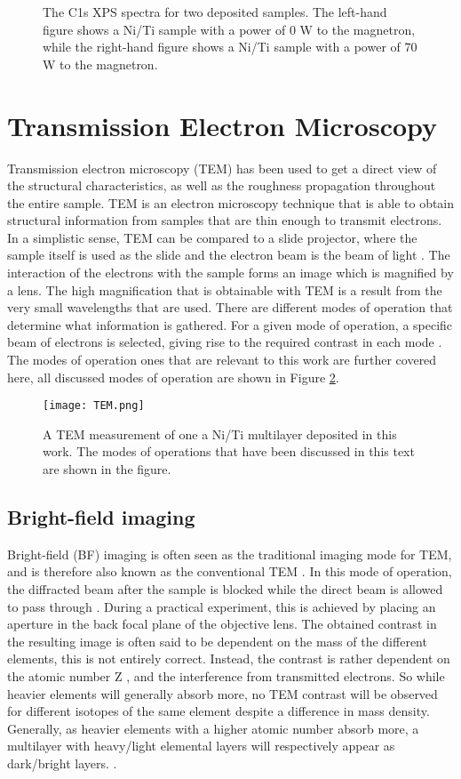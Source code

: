 \begin{figure}
	\centering
	\def\svgwidth{\textwidth}
	
	\caption{The C1s XPS spectra for two deposited samples. The left-hand figure shows a Ni/Ti sample with a power of 0 W to the  \natBC  magnetron, while the right-hand figure shows a Ni/Ti sample with a power of 70 W to the \natBC magnetron.}
	\label{XPS}
\end{figure}
\section{Transmission Electron Microscopy}\label{TEM}
Transmission electron microscopy (TEM) has been used to get a direct view of the structural characteristics, as well as the roughness propagation throughout the entire sample. TEM is an electron microscopy technique that is able to obtain structural information from samples that are thin enough to transmit electrons. In a simplistic sense, TEM can be compared to a slide projector, where the sample itself is used as the slide and the electron beam is the beam of light \cite{ohring}. The interaction of the electrons with the sample forms an image which is magnified by a lens. The high magnification that is obtainable with TEM is a result from the very small wavelengths that are used. There are different modes of operation that determine what information is gathered. For a given mode of operation, a specific beam of electrons is selected, giving rise to the required contrast in each mode \cite{TEM_new}. The modes of operation ones that are relevant to this work are further covered here, all discussed modes of operation are shown in Figure \ref{TEMfig}.
\begin{figure}[h]
	\centering
	\texttt{[image: TEM.png]}
	\caption{A TEM measurement of one a Ni/Ti multilayer deposited in this work. The modes of operations that have been discussed in this text are shown in the figure.}
	\label{TEMfig}
\end{figure}
\subsection{Bright-field imaging}
Bright-field (BF) imaging is often seen as the traditional imaging mode for TEM, and is therefore also known as the conventional TEM \cite{ohring}. In this mode of operation, the diffracted beam after the sample is blocked while the direct beam is allowed to pass through \cite{TEM_new}. During a practical experiment, this is achieved by placing an aperture in the back focal plane of the objective lens. The obtained contrast in the resulting image is often said to be dependent on the mass of the different elements, this is not entirely correct. Instead, the contrast is rather dependent on the atomic number Z \cite{spence2013high}, and the interference from transmitted electrons. So while heavier elements will generally absorb more, no TEM contrast will be observed for different isotopes of the same element despite a difference in mass density. Generally, as heavier elements with a higher atomic number absorb more, a multilayer with heavy/light elemental layers will respectively appear as dark/bright layers. \cite{thesis_naureen}. 
